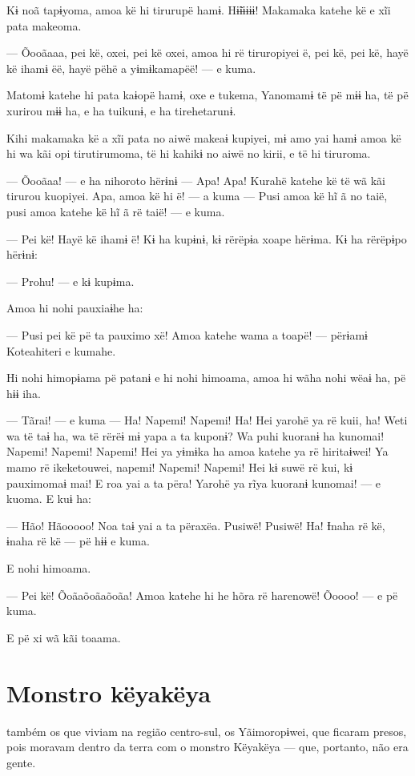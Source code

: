 Kɨ noã tapɨyoma, amoa kë hi tirurupë hamɨ. Hɨ̃ɨɨɨɨɨ! Makamaka katehe kë e
xĩi pata makeoma. 

--- Õooãaaa, pei kë, oxei, pei kë oxei, amoa hi rë tiruropiyei ë, pei
kë, pei kë, hayë kë ihamɨ ëë, hayë pëhë a yɨmɨkamapëë! --- e kuma. 

Matomɨ katehe hi pata kaɨopë hamɨ, oxe e tukema, Yanomamɨ të pë mɨɨ ha,
të pë xurirou mɨɨ ha, e ha tuikunɨ, e ha tirehetarunɨ. 

Kihi makamaka kë a xĩi pata no aiwë makeaɨ kupiyei, mɨ amo yai hamɨ amoa
kë hi wa kãi opi tirutirumoma, të hi kahikɨ no aiwë no kirii, e të hi
tiruroma. 

--- Õooãaa! --- e ha nihoroto hërɨnɨ --- Apa! Apa! Kurahë katehe kë të
wã kãi tirurou kuopiyei. Apa, amoa kë hi ë! --- a kuma --- Pusi amoa kë
hĩ ã no taië, pusi amoa katehe kë hĩ ã rë taië! --- e kuma. 

--- Pei kë! Hayë kë ihamɨ ë! Kɨ ha kupɨnɨ, kɨ rërëpɨa xoape hërɨma. Kɨ
ha rërëpɨpo hërɨnɨ: 

--- Prohu! --- e kɨ kupɨma. 

Amoa hi nohi pauxiaɨhe ha: 

--- Pusi pei kë pë ta pauximo xë! Amoa katehe wama a toapë! --- përɨamɨ
Koteahiteri e kumahe. 

Hi nohi himopɨama pë patanɨ e hi nohi himoama, amoa hi wãha nohi wëaɨ
ha, pë hɨɨ iha. 

--- Tãrai! --- e kuma --- Ha! Napemi! Napemi! Ha! Hei yarohë ya rë kuii,
ha! Weti wa të taɨ ha, wa të rërëɨ mɨ yapa a ta kuponɨ? Wa puhi kuoranɨ
ha kunomai! Napemi! Napemi! Napemi! Hei ya yɨmɨka ha amoa katehe ya rë
hiritaɨwei! Ya mamo rë ikeketouwei, napemi! Napemi! Napemi! Hei kɨ suwë
rë kui, kɨ pauximomaɨ mai! E roa yai a ta përa! Yarohë ya rĩya kuoranɨ
kunomai! --- e kuoma. E kuɨ ha: 

--- Hão! Hãooooo! Noa taɨ yai a ta përaxëa. Pusiwë! Pusiwë! Ha! Ɨnaha rë
kë, ɨnaha rë kë --- pë hɨɨ e kuma. 

E nohi himoama. 

--- Pei kë! Õoãaõoãaõoãa! Amoa katehe hi he hõra rë harenowë! Õoooo! ---
e pë kuma. 

E pë xi wã kãi toaama.

\chapter{Monstro këyakëya}
 
 também os que viviam na região centro-sul, os
Yãimoropɨwei, que ficaram presos, pois moravam dentro da terra com o
monstro Këyakëya --- que, portanto, não era gente. 

